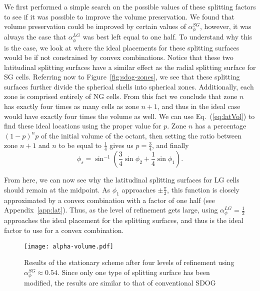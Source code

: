 We first performed a simple search on the possible values of these splitting factors to see if it was possible to improve the volume preservation.
We found that volume preservation could be improved by certain values of $\alpha_{\phi}^{SG}$, however, it was always the case that $\alpha_{\phi}^{LG}$ was best left equal to one half.
To understand why this is the case, we look at where the ideal placements for these splitting surfaces would be if not constrained by convex combinations.
Notice that these two latitudinal splitting surfaces have a similar effect as the radial splitting surface for SG cells.
Referring now to Figure~\ref{fig:sdog-zones}, we see that these splitting surfaces further divide the spherical shells into spherical zones.
Additionally, each zone is comprised entirely of NG cells.
From this fact we conclude that zone $n$ has exactly four times as many cells as zone $n+1$, and thus in the ideal case would have exactly four times the volume as well.
We can use Eq.~(\ref{eq:latVol}) to find these ideal locations using the proper value for $p$.
Zone $n$ has a percentage $\left( 1 - p \right)^{n} p$ of the initial volume of the octant, then setting the ratio between zone $n+1$ and $n$ to be equal to $\frac{1}{4}$ gives us $p = \frac{3}{4}$, and finally
%
\begin{equation} \label{eq:idealLat}
\phi_{s} = \sin^{-1} \left( \frac{3}{4} \sin\phi_{2} + \frac{1}{4} \sin\phi_{1} \right).
\end{equation}


From here, we can now see why the latitudinal splitting surfaces for LG cells should remain at the midpoint.
As $\phi_{1}$ approaches $\pm \frac{\pi}{2}$, this function is closely approximated by a convex combination with a factor of one half (see Appendix~\ref{app:lat}).
Thus, as the level of refinement gets large, using $\alpha_{\phi}^{LG} = \frac{1}{2}$ approaches the ideal placement for the splitting surfaces, and thus is the ideal factor to use for a convex combination.


\begin{figure}[tb]
	\texttt{[image: alpha-volume.pdf]}
	\caption[Title]{
		Results of the stationary scheme after four levels of refinement using $\alpha_{\phi}^{SG} \approx 0.54$.
		Since only one type of splitting surface has been modified, the results are similar to that of conventional SDOG
	}
	\label{fig:alpha-volume}
\end{figure}


